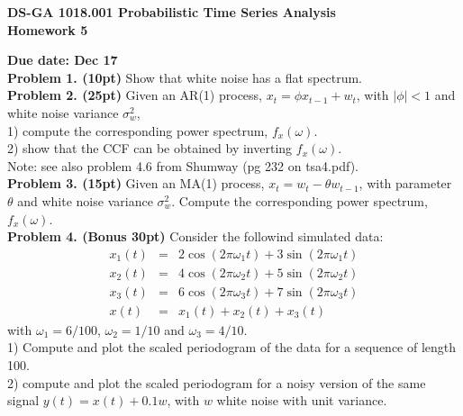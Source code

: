 \documentclass[12pt]{article}
\begin{document}
\thispagestyle{empty}
\begin{center}

\textbf{DS-GA 1018.001  Probabilistic Time Series Analysis \\
Homework 5}
\end{center}

\noindent \textbf{Due date: Dec 17}\\

\noindent \textbf{Problem 1. (10pt)} Show that white noise has a flat spectrum.\\

\noindent \textbf{Problem 2. (25pt)} Given an AR(1) process, $ x_t = \phi x_{t-1} + w_t$, with $|\phi|<1$ and white noise variance $\sigma_w^2$, \\
1) compute the corresponding power spectrum, $f_x(\omega)$.\\
2) show that the CCF can be obtained by inverting $f_x(\omega)$.\\
Note: see also problem 4.6 from Shumway (pg 232 on tsa4.pdf).\\

\noindent \textbf{Problem 3. (15pt)} Given an MA(1) process, $ x_t = w_t - \theta w_{t-1}$, with parameter $\theta$ and white noise variance $\sigma_w^2$. Compute the corresponding power spectrum, $f_x(\omega)$. \\

\noindent \textbf{Problem 4. (Bonus 30pt)}  Consider the followind simulated data:
\begin{eqnarray}
x_1(t) & = &  2 \cos(2\pi \omega_1 t) + 3 \sin(2\pi \omega_1 t) \\
x_2(t) & = & 4 \cos(2\pi \omega_2 t) + 5 \sin(2\pi \omega_2 t) \\
 x_3(t) & = & 6 \cos(2\pi \omega_3 t) + 7\sin(2\pi \omega_3 t) \\
 x(t) &=& x_1(t) + x_2(t) + x_3(t)
\end{eqnarray}
with $\omega_1 = 6/100$, $\omega_2 = 1/10$ and  $\omega_3 = 4/10$. \\ 1) Compute and plot the scaled periodogram of the data for a sequence of length 100. \\
2) compute and plot the scaled periodogram for a noisy version of the same signal $y(t) = x(t) + 0.1 w$, with $w$ white noise with unit variance.
\end{document}
